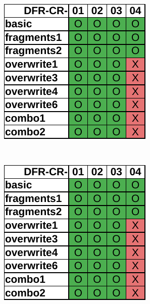 \begin{figure}
    \centering

    \begin{subfigure}{0.3\linewidth}
        \includegraphics[width=\linewidth]{fig/autopsy_results_ntfs.pdf}
    \end{subfigure}~~
    \begin{subfigure}{0.3\linewidth}
        \includegraphics[width=\linewidth]{fig/recuva_results_ntfs.pdf}

\end{subfigure}
\end{figure}
